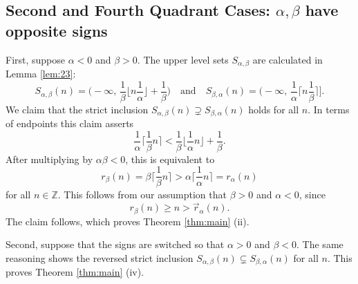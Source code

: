 \documentclass[12pt,letterpaper, reqno]{amsart}
\theoremstyle{definition}
\theoremstyle{remark}
\newcommand{\ZZ}{\ensuremath{\mathbb{Z}}}
\newcommand{\floor}[1]{\lfloor{#1}\rfloor}
\newcommand{\ceil}[1]{\lceil{#1}\rceil}
\newcommand{\tround}{\vec{r}}
\newcommand{\round}{r}
\begin{document}
\subsection{Second and Fourth Quadrant Cases: $\alpha, \beta$ have opposite signs}\label{sec:31}
First, suppose $\alpha<0$ and $\beta>0$.
The upper level sets $S_{\alpha,\beta}$ are calculated in Lemma \ref{lem:23}:
\[ S_{\alpha,\beta}(n)  = \bigg(-\infty, \, \frac1\beta \floor{n\frac1\alpha} +\frac1\beta\bigg)
\quad\text{and}\quad
 S_{\beta,\alpha}(n) = \bigg(-\infty, \,\frac1\alpha \ceil{n\frac1\beta}\bigg] 
.\]
We claim that the strict inclusion $S_{\alpha,\beta}(n)\supsetneq S_{\beta,\alpha}(n)$ holds for all $n$.
In  terms of endpoints this claim asserts
\[ 
 \frac1\alpha \ceil{\frac{1}{\beta} n} < \frac1\beta \floor{\frac{1}{\alpha} n} +\frac1\beta .\]
After multiplying by $\alpha\beta<0$, this is equivalent to
\[ r_\beta(n) = \beta \ceil{\frac{1}{\beta} n} > \alpha \ceil{\frac{1}{\alpha} n} = \round_\alpha(n)\]
for all $n\in\ZZ$.
This follows from our assumption that $\beta>0$ and $\alpha<0$, since
\[ r_\beta(n) \geq n > \tround_\alpha(n).\]
The claim follows, which proves Theorem \ref{thm:main} (ii).

Second, suppose that
 the signs are switched so that $\alpha >0$ and $\beta<0$.
 The same reasoning shows the reversed strict inclusion $S_{\alpha,\beta}(n)\subsetneq S_{\beta,\alpha}(n)$ for all $n$.
This proves Theorem \ref{thm:main} (iv).

%
%
\end{document}
